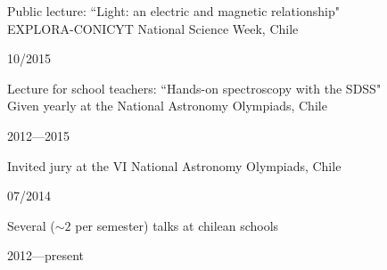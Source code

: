 \documentclass[11pt, a4paper]{article} %
\begin{document}
\vspace{0.3 cm}

\begin{minipage}[t]{0.7\textwidth}
\begin{flushleft}%
  \setlength{\leftskip}{0.2cm}%
Public lecture: ``Light: an electric and magnetic relationship"\\
EXPLORA-CONICYT National Science Week, Chile
\end{flushleft}
\end{minipage}
\begin{minipage}[t]{0.3\textwidth}
\hfill 10/2015
\end{minipage}

\vspace{0.3 cm}

\begin{minipage}[t]{0.7\textwidth}
\begin{flushleft}%
  \setlength{\leftskip}{0.2cm}%
Lecture for school teachers: ``Hands-on spectroscopy with the SDSS"\\
Given yearly at the National Astronomy Olympiads, Chile  
\end{flushleft}
\end{minipage}
\begin{minipage}[t]{0.3\textwidth}
\hfill 2012---2015
\end{minipage}

\vspace{0.3 cm}

\begin{minipage}[t]{0.7\textwidth}
\begin{flushleft}%
  \setlength{\leftskip}{0.2cm}%
Invited jury at the VI National Astronomy Olympiads, Chile  
\end{flushleft}
\end{minipage}
\begin{minipage}[t]{0.3\textwidth}
\hfill 07/2014
\end{minipage}

\vspace{0.3 cm}

\begin{minipage}[t]{0.7\textwidth}
\begin{flushleft}%
  \setlength{\leftskip}{0.2cm}%
Several ($\sim 2$ per semester) talks at chilean schools 
\end{flushleft}
\end{minipage}
\begin{minipage}[t]{0.3\textwidth}
\hfill 2012---present
\end{minipage}
\end{document}
